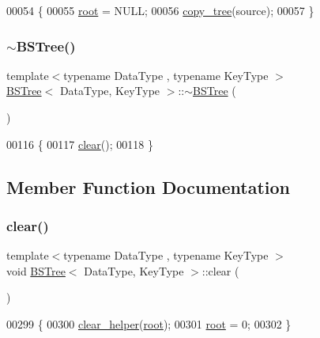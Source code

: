 \begin{DoxyCode}
00054 \{
00055     \hyperlink{class_b_s_tree_a83534afce9094181ac031f9f596a8625}{root} = NULL;
00056     \hyperlink{class_b_s_tree_a7423df4da3dd2035e681a67c321ec719}{copy\_tree}(source);
00057 \}
\end{DoxyCode}
\hypertarget{class_b_s_tree_a968c51c539f4ae41357c78b6a60fea4c}{}\label{class_b_s_tree_a968c51c539f4ae41357c78b6a60fea4c} 
\subsubsection{\texorpdfstring{$\sim$\+B\+S\+Tree()}{~BSTree()}}
{\footnotesize\ttfamily template$<$typename Data\+Type , typename Key\+Type $>$ \\
\hyperlink{class_b_s_tree}{B\+S\+Tree}$<$ Data\+Type, Key\+Type $>$\+::$\sim$\hyperlink{class_b_s_tree}{B\+S\+Tree} (\begin{DoxyParamCaption}{ }\end{DoxyParamCaption})}


\begin{DoxyCode}
00116 \{
00117     \hyperlink{class_b_s_tree_a926822d08f3d0321603f9fafd2254b16}{clear}();
00118 \}
\end{DoxyCode}


\subsection{Member Function Documentation}
\hypertarget{class_b_s_tree_a926822d08f3d0321603f9fafd2254b16}{}\label{class_b_s_tree_a926822d08f3d0321603f9fafd2254b16} 
\subsubsection{\texorpdfstring{clear()}{clear()}}
{\footnotesize\ttfamily template$<$typename Data\+Type , typename Key\+Type $>$ \\
void \hyperlink{class_b_s_tree}{B\+S\+Tree}$<$ Data\+Type, Key\+Type $>$\+::clear (\begin{DoxyParamCaption}{ }\end{DoxyParamCaption})}


\begin{DoxyCode}
00299 \{
00300     \hyperlink{class_b_s_tree_a0c759512b61b88b824266d501beaf842}{clear\_helper}(\hyperlink{class_b_s_tree_a83534afce9094181ac031f9f596a8625}{root});
00301     \hyperlink{class_b_s_tree_a83534afce9094181ac031f9f596a8625}{root} = 0;
00302 \}
\end{DoxyCode}
\hypertarget{class_b_s_tree_a0c759512b61b88b824266d501beaf842}{}\label{class_b_s_tree_a0c759512b61b88b824266d501beaf842} 

